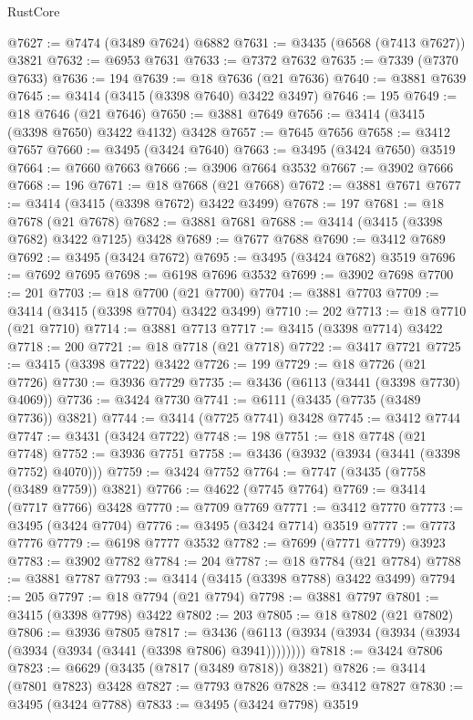 \begin{lexlean}{RustCore}
\begin{coremodule}
@7627 := @7474 (@3489 @7624) @6882
@7631 := @3435 (@6568 (@7413 @7627)) @3821
@7632 := @6953 @7631
@7633 := @7372 @7632
@7635 := @7339 (@7370 @7633)
@7636 := 194
@7639 := @18 @7636 (@21 @7636)
@7640 := @3881 @7639
@7645 := @3414 (@3415 (@3398 @7640) @3422 @3497)
@7646 := 195
@7649 := @18 @7646 (@21 @7646)
@7650 := @3881 @7649
@7656 := @3414 (@3415 (@3398 @7650) @3422 @4132) @3428
@7657 := @7645 @7656
@7658 := @3412 @7657
@7660 := @3495 (@3424 @7640)
@7663 := @3495 (@3424 @7650) @3519
@7664 := @7660 @7663
@7666 := @3906 @7664 @3532
@7667 := @3902 @7666
@7668 := 196
@7671 := @18 @7668 (@21 @7668)
@7672 := @3881 @7671
@7677 := @3414 (@3415 (@3398 @7672) @3422 @3499)
@7678 := 197
@7681 := @18 @7678 (@21 @7678)
@7682 := @3881 @7681
@7688 := @3414 (@3415 (@3398 @7682) @3422 @7125) @3428
@7689 := @7677 @7688
@7690 := @3412 @7689
@7692 := @3495 (@3424 @7672)
@7695 := @3495 (@3424 @7682) @3519
@7696 := @7692 @7695
@7698 := @6198 @7696 @3532
@7699 := @3902 @7698
@7700 := 201
@7703 := @18 @7700 (@21 @7700)
@7704 := @3881 @7703
@7709 := @3414 (@3415 (@3398 @7704) @3422 @3499)
@7710 := 202
@7713 := @18 @7710 (@21 @7710)
@7714 := @3881 @7713
@7717 := @3415 (@3398 @7714) @3422
@7718 := 200
@7721 := @18 @7718 (@21 @7718)
@7722 := @3417 @7721
@7725 := @3415 (@3398 @7722) @3422
@7726 := 199
@7729 := @18 @7726 (@21 @7726)
@7730 := @3936 @7729
@7735 := @3436 (@6113 (@3441 (@3398 @7730) @4069))
@7736 := @3424 @7730
@7741 := @6111 (@3435 (@7735 (@3489 @7736)) @3821)
@7744 := @3414 (@7725 @7741) @3428
@7745 := @3412 @7744
@7747 := @3431 (@3424 @7722)
@7748 := 198
@7751 := @18 @7748 (@21 @7748)
@7752 := @3936 @7751
@7758 := @3436 (@3932 (@3934 (@3441 (@3398 @7752) @4070)))
@7759 := @3424 @7752
@7764 := @7747 (@3435 (@7758 (@3489 @7759)) @3821)
@7766 := @4622 (@7745 @7764)
@7769 := @3414 (@7717 @7766) @3428
@7770 := @7709 @7769
@7771 := @3412 @7770
@7773 := @3495 (@3424 @7704)
@7776 := @3495 (@3424 @7714) @3519
@7777 := @7773 @7776
@7779 := @6198 @7777 @3532
@7782 := @7699 (@7771 @7779) @3923
@7783 := @3902 @7782
@7784 := 204
@7787 := @18 @7784 (@21 @7784)
@7788 := @3881 @7787
@7793 := @3414 (@3415 (@3398 @7788) @3422 @3499)
@7794 := 205
@7797 := @18 @7794 (@21 @7794)
@7798 := @3881 @7797
@7801 := @3415 (@3398 @7798) @3422
@7802 := 203
@7805 := @18 @7802 (@21 @7802)
@7806 := @3936 @7805
@7817 := @3436 (@6113 (@3934 (@3934 (@3934 (@3934 (@3934 (@3934 (@3441 (@3398 @7806) @3941))))))))
@7818 := @3424 @7806
@7823 := @6629 (@3435 (@7817 (@3489 @7818)) @3821)
@7826 := @3414 (@7801 @7823) @3428
@7827 := @7793 @7826
@7828 := @3412 @7827
@7830 := @3495 (@3424 @7788)
@7833 := @3495 (@3424 @7798) @3519

\end{coremodule}
\end{lexlean}
